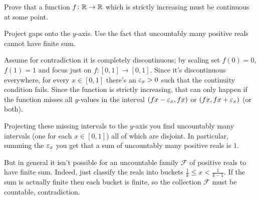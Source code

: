\begin{problem}
	\yod
	Prove that a function $f \colon \mathbb R \to \mathbb R$ which is strictly increasing
	must be continuous at some point.
	\begin{hint}
		Project gaps onto the $y$-axis.
		Use the fact that uncountably many positive reals cannot have finite sum.
	\end{hint}
	\begin{sol}
		Assume for contradiction it is completely discontinuous;
		by scaling set $f(0) = 0$, $f(1) = 1$ and focus just on $f \colon [0,1] \to [0,1]$.
		Since it's discontinuous everywhere,
		for every $x \in [0,1]$ there's an $\varepsilon_x > 0$
		such that the continuity condition fails.
		Since the function is strictly increasing,
		that can only happen if the
		function misses all $y$-values in the interval
		$(fx-\varepsilon_x, fx)$ or $(fx, fx+\varepsilon_x)$ (or both).

		Projecting these missing intervals to the $y$-axis you find uncountably
		many intervals (one for each $x \in [0,1]$) all of which are disjoint.
		In particular, summing the $\varepsilon_x$ you get that a sum of uncountably
		many positive reals is $1$.

		But in general it isn't possible for an uncountable family $\mathcal F$
		of positive reals to have finite sum.
		Indeed, just classify the reals into buckets $\frac1k \le x < \frac1{k-1}$.
		If the sum is actually finite then each bucket is finite,
		so the collection $\mathcal F$ must be countable, contradiction.
	\end{sol}
\end{problem}
